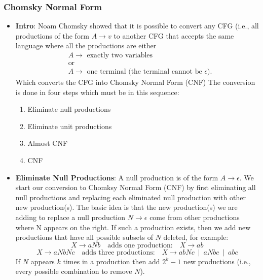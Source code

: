 \documentclass{report}
\begin{document}
    \pagebreak 
    \subsubsection{Chomsky Normal Form}
    \begin{itemize}
        \item \textbf{Intro}: Noam Chomsky showed that it is possible to convert any CFG (i.e., all productions of the form $A\to v$ to another CFG that accepts the same language where all the productions are either
            \begin{align*}
                &A\to \text{ exactly two variables} \\
                &\text{or} \\
                &A\to \text{ one terminal (the terminal cannot be $\epsilon$)} 
            .\end{align*}
            Which converts the CFG into Chomsky Normal Form (CNF)
            \bigbreak \noindent 
            The conversion is done in four steps which must be in this sequence:
            \begin{enumerate}
                \item Eliminate null productions
                \item Eliminate unit productions
                \item Almost CNF
                \item CNF
            \end{enumerate}
        \item \textbf{Eliminate Null Productions}: A null production is of the form $A\to \epsilon$.
            \bigbreak \noindent 
            We start our conversion to Chomksy Normal Form (CNF) by first eliminating all null productions and replacing each eliminated null production with other new production(s).
            \bigbreak \noindent 
            The basic idea is that the new production(s) we are adding to replace a null production $N\to \epsilon$ come from other productions where N appears on the right.
            \bigbreak \noindent 
            If such a production exists, then we add new productions that have all possible subsets of \(N\) deleted, for example:
            \[
                X \rightarrow aNb \quad \text{adds one production:} \quad X \rightarrow ab
            \]
            \[
                X \rightarrow aNbNc \quad \text{adds three productions:} \quad X \rightarrow abNc \ \mid\ aNbc \ \mid\ abc
            \]
            If \(N\) appears \(k\) times in a production then add \(2^k - 1\) new productions (i.e., every possible combination to remove \(N\)).

\end{itemize}
\end{document}

